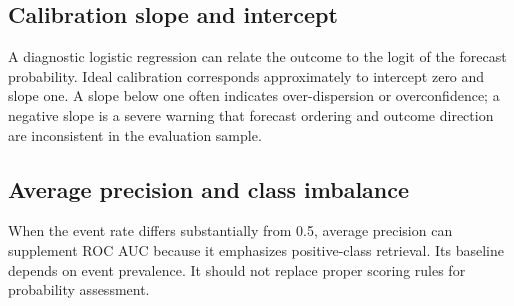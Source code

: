 \documentclass[11pt]{article}
\begin{document}
\subsection{Calibration slope and intercept}
A diagnostic logistic regression can relate the outcome to the logit of the forecast probability. Ideal calibration corresponds approximately to intercept zero and slope one. A slope below one often indicates over-dispersion or overconfidence; a negative slope is a severe warning that forecast ordering and outcome direction are inconsistent in the evaluation sample.

\subsection{Average precision and class imbalance}
When the event rate differs substantially from 0.5, average precision can supplement ROC AUC because it emphasizes positive-class retrieval. Its baseline depends on event prevalence. It should not replace proper scoring rules for probability assessment.
\end{document}
